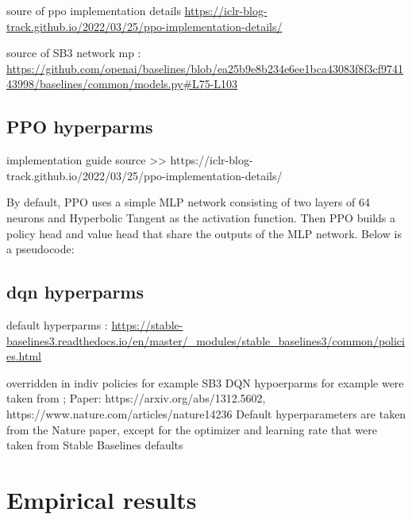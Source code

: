 \documentclass[a4paper, 12pt]{article}
\begin{document}
soure of ppo implementation details \url{https://iclr-blog-track.github.io/2022/03/25/ppo-implementation-details/}

source of SB3 network mp : \url{https://github.com/openai/baselines/blob/ea25b9e8b234e6ee1bca43083f8f3cf974143998/baselines/common/models.py#L75-L103}

\subsection{PPO hyperparms}

implementation guide source >> https://iclr-blog-track.github.io/2022/03/25/ppo-implementation-details/

By default, PPO uses a simple MLP network consisting of two layers of 64 neurons and Hyperbolic Tangent as the activation function. Then PPO builds a policy head and value head that share the outputs of the MLP network. Below is a pseudocode:

\subsection{dqn hyperparms}


default hyperparms : \url{https://stable-baselines3.readthedocs.io/en/master/_modules/stable_baselines3/common/policies.html}

overridden in indiv policies for example 
SB3 DQN hypoerparms for example were taken from ;
Paper: https://arxiv.org/abs/1312.5602, https://www.nature.com/articles/nature14236
Default hyperparameters are taken from the Nature paper,
except for the optimizer and learning rate that were taken from Stable Baselines defaults


\section{Empirical results}
\end{document}
